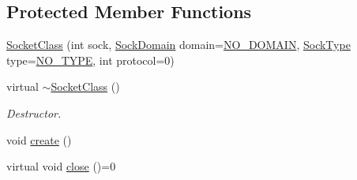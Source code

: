 \subsection*{Protected Member Functions}
\begin{DoxyCompactItemize}
\item 
\hyperlink{classSocketClass_ac291e571738e1778010c2fd1731eb659}{Socket\+Class} (int sock, \hyperlink{classSocketClass_ac940413abaa7328db8518a9f121babb6}{Sock\+Domain} domain=\hyperlink{classSocketClass_ac940413abaa7328db8518a9f121babb6aa9ec2a4d642c47813fe90f362603f1c4}{N\+O\+\_\+\+D\+O\+M\+A\+IN}, \hyperlink{classSocketClass_a2182dd9fee09459fabb99e6ae717f595}{Sock\+Type} type=\hyperlink{classSocketClass_a2182dd9fee09459fabb99e6ae717f595a8c7f955ea5b71498ff1d469345d813ad}{N\+O\+\_\+\+T\+Y\+PE}, int protocol=0)
\item 
virtual \hyperlink{classSocketClass_a14830bd93e1befaf276625e8b28181b9}{$\sim$\+Socket\+Class} ()
\begin{DoxyCompactList}\small\item\em Destructor. \end{DoxyCompactList}\item 
void \hyperlink{classSocketClass_a4d4f7b6c50741127bc1ad82f43fc625c}{create} ()
\item 
virtual void \hyperlink{classSocketClass_a92c8c1b22b98f0231932cbd84cdc4cfe}{close} ()=0
\end{DoxyCompactItemize}
